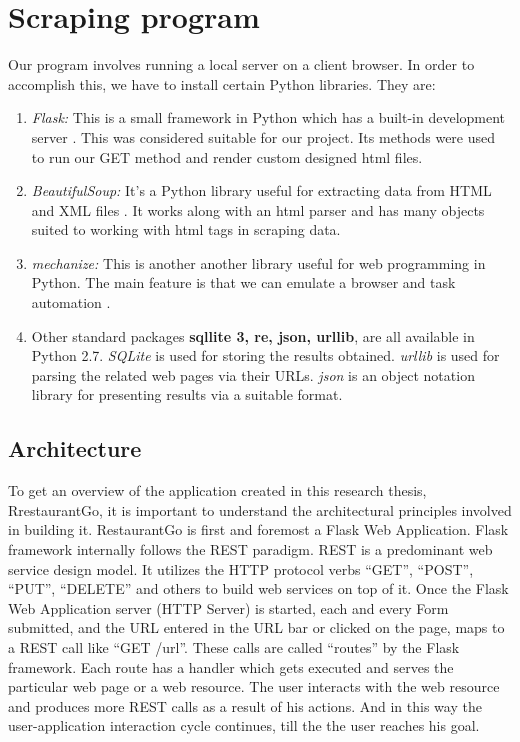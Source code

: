 \section{Scraping program}
Our program involves running a local server on a client browser. In order to accomplish this, we have to install certain Python libraries. They are:
\begin{enumerate}
\item \textsl{Flask:} This is a small framework in Python which has a built-in development server \cite{24}. This was considered suitable for our project. Its methods were used to run our GET method and render custom designed html files.
\item \textsl{BeautifulSoup:} It’s a Python library useful for extracting data from HTML and XML files \cite{6}. It works along with an html parser and has many objects suited to working with html tags in scraping data.
\item \textsl{mechanize:} This is another another library useful for web programming in Python. The main feature is that we can emulate a browser and task automation \cite{5}.
\item Other standard packages \textbf{sqllite 3, re, json, urllib}, are all available in Python 2.7. \textsl{SQLite} is used for storing the results obtained. \textsl{urllib} is used for parsing the related web pages via their URLs. \textsl{json} is an object notation library for presenting results via a suitable format.
\end{enumerate}

\subsection{Architecture}
To get an overview of the application created in this research thesis, RrestaurantGo, it is important to understand the architectural principles involved in building it. RestaurantGo is first and foremost a Flask Web Application. Flask framework internally follows the REST paradigm. REST is a predominant web service design model. It utilizes the HTTP protocol verbs “GET”, “POST”, “PUT”, “DELETE” and others to build web services on top of it. Once the Flask Web Application server (HTTP Server) is started, each and every Form submitted, and the URL entered in the URL bar or clicked on the page, maps to a REST call like “GET /url”. These calls are called “routes” by the Flask framework. Each route has a handler which gets executed and serves the particular web page or a web resource. The user interacts with the web resource and produces more REST calls as a result of his actions. And in this way the user-application interaction cycle continues, till the the user reaches his goal.

